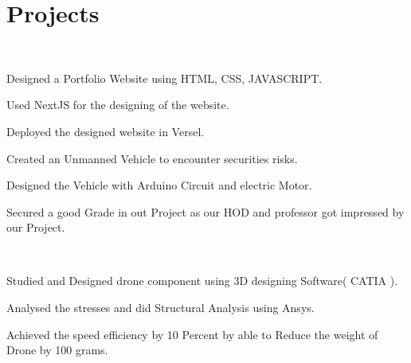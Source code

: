 \documentclass[]{deedy-resume-openfont}
\begin{document}
\begin{minipage}[t]{0.66\textwidth} 


\section{Projects} 

 \\
\vspace{\topsep}
\begin{tightemize}

\item Designed a Portfolio Website using HTML, CSS, JAVASCRIPT.
\item Used NextJS for the designing of the website.
\item Deployed the designed website in Versel.
\end{tightemize}

\sectionsep


\begin{tightemize}
\item Created an Unmanned Vehicle to encounter securities risks.
\item Designed the Vehicle with Arduino Circuit and electric Motor.
\item Secured a good Grade in out Project as our HOD and professor got impressed by our Project.
\end{tightemize}

\sectionsep

 \\
\begin{tightemize}
\item Studied and Designed drone component using 3D designing Software( CATIA ).
\item Analysed the stresses and did Structural Analysis using Ansys.
\item Achieved the speed efficiency by 10 Percent by able to Reduce the weight of Drone by 100 grams.
\end{tightemize}
\sectionsep


\end{minipage}
\end{document}

